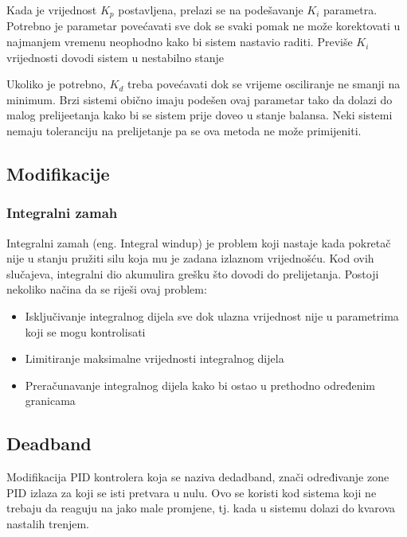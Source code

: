 \documentclass[../Document.tex]{subfiles}
\begin{document}

\noindent Kada je vrijednost $K_p$ postavljena, prelazi se na podešavanje $K_i$ parametra. Potrebno je parametar povećavati sve dok se svaki pomak ne može korektovati u najmanjem vremenu neophodno kako bi sistem nastavio raditi. Previše $K_i$ vrijednosti dovodi sistem u nestabilno stanje


\noindent Ukoliko je potrebno, $K_d$ treba povećavati dok se vrijeme osciliranje ne smanji na minimum. Brzi sistemi obično imaju podešen ovaj parametar tako da dolazi do malog prelijeetanja kako bi se sistem prije doveo u stanje balansa. Neki sistemi nemaju toleranciju na prelijetanje pa se ova metoda ne može primijeniti.


\subsection{Modifikacije}

\subsubsection{Integralni zamah}
Integralni zamah (eng. Integral windup) je problem koji nastaje kada pokretač nije u stanju pružiti silu koja mu je zadana izlaznom vrijednošću. Kod ovih slučajeva, integralni dio akumulira grešku što dovodi do prelijetanja. Postoji nekoliko načina da se riješi ovaj problem:

\begin{itemize}
    \item Isključivanje integralnog dijela sve dok ulazna vrijednost nije u parametrima koji se mogu kontrolisati
    \item Limitiranje maksimalne vrijednosti integralnog dijela 
    \item Preračunavanje integralnog dijela kako bi ostao u prethodno određenim granicama
\end{itemize}

\subsection{Deadband}
Modifikacija PID kontrolera koja se naziva dedadband, znači određivanje zone PID izlaza za koji se isti pretvara u nulu. Ovo se koristi kod sistema koji ne trebaju da reaguju na jako male promjene, tj. kada u sistemu dolazi do kvarova nastalih trenjem.
\end{document}
